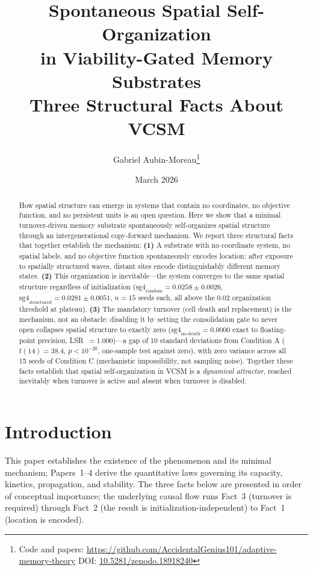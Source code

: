 \documentclass[11pt,twocolumn]{article}
\title{\textbf{Spontaneous Spatial Self-Organization\\
in Viability-Gated Memory Substrates}\\[0.5em]
\large Three Structural Facts About VCSM}
\author{Gabriel Aubin-Moreau\thanks{Code and papers: \url{https://github.com/AccidentalGenius101/adaptive-memory-theory} \quad DOI: \href{https://doi.org/10.5281/zenodo.18918240}{10.5281/zenodo.18918240}}}
\date{March 2026}
\begin{document}
\maketitle

\begin{abstract}
How spatial structure can emerge in systems that contain no coordinates, no
objective function, and no persistent units is an open question.
Here we show that a minimal turnover-driven memory substrate spontaneously
self-organizes spatial structure through an intergenerational copy-forward mechanism.
We report three structural facts that together establish the mechanism:
\textbf{(1)} A substrate with no coordinate system, no spatial labels, and no
objective function spontaneously encodes location: after exposure to spatially
structured waves, distant sites encode distinguishably different memory states.
\textbf{(2)} This organization is inevitable---the system converges to the same
spatial structure regardless of initialization
($\text{sg4}_\text{random} = 0.0258 \pm 0.0026$,
$\text{sg4}_\text{structured} = 0.0281 \pm 0.0051$, $n=15$ seeds each,
all above the 0.02 organization threshold at plateau).
\textbf{(3)} The mandatory turnover (cell death and replacement) is the mechanism,
not an obstacle: disabling it by setting the consolidation gate to never open
collapses spatial structure to exactly zero
($\text{sg4}_\text{no-death} = 0.0000$ exact to floating-point precision,
LSR~$= 1.000$)---a gap of
10 standard deviations from Condition A ($t(14) = 38.4$, $p < 10^{-20}$,
one-sample test against zero), with zero variance across all 15 seeds of
Condition C (mechanistic impossibility, not sampling noise).
Together these facts establish that spatial self-organization in VCSM is a
\emph{dynamical attractor}, reached inevitably when turnover is active and
absent when turnover is disabled.
\end{abstract}

\section{Introduction}

This paper establishes the existence of the phenomenon and its minimal mechanism;
Papers~1--4 derive the quantitative laws governing its capacity, kinetics,
propagation, and stability.
The three facts below are presented in order of conceptual importance;
the underlying causal flow runs Fact~3 (turnover is required) through
Fact~2 (the result is initialization-independent) to Fact~1 (location is encoded).
\end{document}
